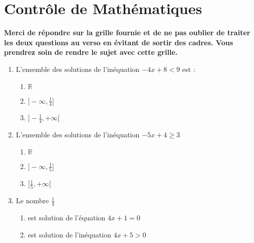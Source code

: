 \documentclass[oneside,twocolumn,landscape]{book}
\begin{document}
\section*{Contrôle de Mathématiques}

\let\MauvaiseReponse\null
\let\BonneReponse\null



{\bf Merci de répondre sur la grille fournie et de ne pas oublier de traiter les deux questions au verso en évitant de sortir des cadres. Vous prendrez soin de rendre le sujet avec cette grille.}
\vspace{2em}



\begin{enumerate}


\item L'ensemble des solutions de l'inéquation $-4 x+8<9$ est :

\begin{enumerate}

\item\MauvaiseReponse $\mathbb{R}$


\item\MauvaiseReponse $]-\infty, \frac{1}{4}]$
\item\BonneReponse $]-\frac{1}{4},+\infty[$

\end{enumerate}






\item L'ensemble des solutions de l'inéquation $-5x+4 \geqslant 3$

\begin{enumerate}

\item\MauvaiseReponse $\mathbb{R}$

\item\BonneReponse $]-\infty,\frac{1}{5}]$
\item\MauvaiseReponse $[\frac{1}{5},+\infty[$


\end{enumerate}





\item Le nombre $\frac{1}{4}$

\begin{enumerate}

\item\MauvaiseReponse est solution de l'équation $4x+1=0$
\item\BonneReponse est solution de l'inéquation $4x+5>0$


\end{enumerate}
\end{enumerate}
\end{document}
